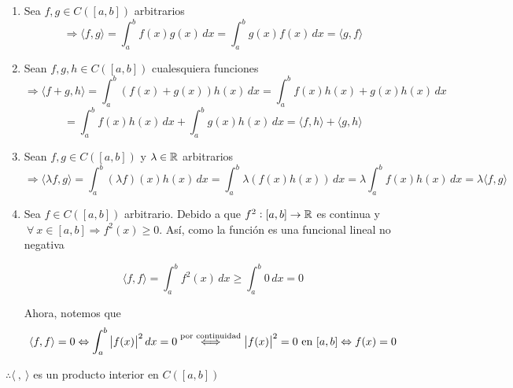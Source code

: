 \begin{proofexplanation}
    \begin{enumerate}
        \item Sea $f,g \in C([a,b]) $ arbitrarios
        \begin{equation*}
            \Rightarrow \langle f , g \rangle = \int_{a}^{b} f(x)g(x) \, dx =  \int_{a}^{b} g(x)f(x) \, dx = \langle g , f \rangle
        \end{equation*}
        \item Sean $f,g,h \in C([a,b]) $ cualesquiera funciones
        \begin{equation*}
            \Rightarrow \langle f + g, h \rangle = \int_{a}^{b} (f(x)+g(x))h(x) \, dx = \int_{a}^{b} f(x)h(x)+g(x)h(x) \, dx 
        \end{equation*}
        \begin{equation*}
            = \int_{a}^{b} f(x)h(x)\, dx + \int_{a}^{b} g(x)h(x)\, dx =  \langle f , h \rangle +  \langle  g, h \rangle
        \end{equation*}
        \item Sean $f,g \in  C([a,b])$ y $\lambda \in \mathbb{R}$ arbitrarios
        \begin{equation*}
            \Rightarrow \langle \lambda f, g  \rangle  = \int_{a}^{b} (\lambda f)(x)h(x)\, dx = \int_{a}^{b} \lambda( f(x)h(x))\, dx =  \lambda \int_{a}^{b}  f(x)h(x)\, dx = \lambda \langle  f, g  \rangle 
        \end{equation*}
        \item Sea $f \in  C([a,b])$ arbitrario. Debido a que $f^2 : [a,b] \to \mathbb{R}$ es continua y $\: \forall \: x \in [a,b] \Rightarrow f^2 (x) \geqslant 0$. Así, como la función es una funcional lineal no negativa 

        \begin{equation*}
            \langle f, f \rangle = \int_{a}^{b} f^2(x)\, dx \geqslant \int_{a}^{b} 0 \, dx = 0
        \end{equation*}

        Ahora, notemos que
        \begin{equation*}
            \langle f, f \rangle=0 \Leftrightarrow \int_a^b \abs{f(x)}^2\,dx=0\stackrel{\text{por continuidad}}\Longleftrightarrow \abs{f(x)}^2=0\,\,\text{en}\,\,[a,b]\Leftrightarrow f(x)=0
        \end{equation*}
    \end{enumerate}
    $\therefore \langle \: , \: \rangle$ es un producto interior en $C([a,b])$
\end{proofexplanation}

